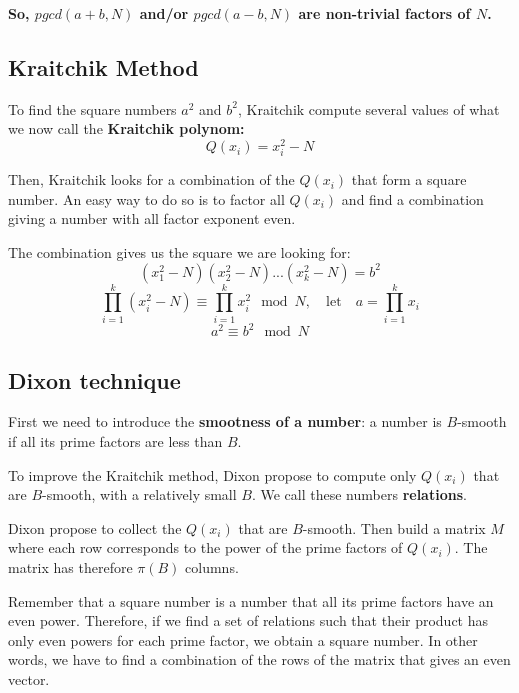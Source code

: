 \documentclass[a4paper, 11pt]{article}
\begin{document}
\textbf{So, $pgcd(a+b,N)$ and/or $pgcd(a-b,N)$ are non-trivial factors of $N$.}

\subsection{Kraitchik Method}

To find the square numbers $a^2$ and $b^2$, Kraitchik compute several values of what we now call the \textbf{Kraitchik polynom:}
\begin{equation}
    Q(x_i) = x_i^2 - N
\end{equation}

Then, Kraitchik looks for a combination of the $Q(x_i)$ that form a square number. An easy way to do so is to factor all $Q(x_i)$ and find a combination giving a number with all factor exponent even.

The combination gives us the square we are looking for:
\begin{equation}
    (x_1^2 - N)(x_2^2 - N)...(x_k^2 - N) = b^2
\end{equation}
\begin{equation}
    \prod_{i=1}^{k} (x_i^2 - N) \equiv  \prod_{i=1}^{k} x_i^2 \mod N, \quad \text{let} \quad a = \prod_{i=1}^{k} x_i
\end{equation}
\begin{equation}
    a^2 \equiv b^2 \mod N
\end{equation}

\subsection{Dixon technique}

First we need to introduce the \textbf{smootness of a number}:
a number is $B$-smooth if all its prime factors are less than $B$.

To improve the Kraitchik method, Dixon propose to compute only $Q(x_i)$ that are $B$-smooth, with a relatively small $B$. We call these numbers \textbf{relations}.

Dixon propose to collect the $Q(x_i)$ that are $B$-smooth. Then build a matrix $M$ where each row corresponds to the power of the prime factors of $Q(x_i)$. The matrix has therefore $\pi(B)$ columns.

Remember that a square number is a number that all its prime factors have an even power. Therefore, if we find a set of relations such that their product has only even powers for each prime factor, we obtain a square number. In other words, we have to find a combination of the rows of the matrix that gives an even vector.
\end{document}
